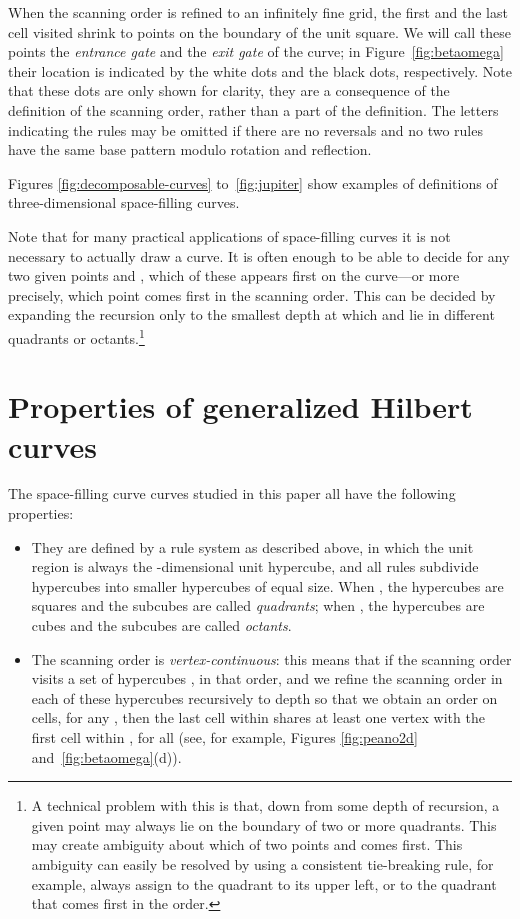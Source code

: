 \documentclass[11pt,a4paper]{article}
\begin{document}
When the scanning order is refined to an infinitely fine grid, the first and the last cell visited shrink to points on the boundary of the unit square. We will call these points the \emph{entrance gate} and the \emph{exit gate} of the curve; in Figure~\ref{fig:betaomega} their location is indicated by the white dots and the black dots, respectively. Note that these dots are only shown for clarity, they are a consequence of the definition of the scanning order, rather than a part of the definition.
The letters indicating the rules may be omitted if there are no reversals and no two rules have the same base pattern modulo rotation and reflection.

Figures \ref{fig:decomposable-curves} to~\ref{fig:jupiter} show examples of definitions of three-dimensional space-filling curves.

Note that for many practical applications of space-filling curves it is not necessary to actually draw a curve. It is often enough to be able to decide for any two given points  and , which of these appears first on the curve---or more precisely, which point comes first in the scanning order. This can be decided by expanding the recursion only to the smallest depth at which  and  lie in different quadrants or octants.\footnote{A technical problem with this is that, down from some depth of recursion, a given point  may always lie on the boundary of two or more quadrants. This may create ambiguity about which of two points  and  comes first. This ambiguity can easily be resolved by using a consistent tie-breaking rule, for example, always assign  to the quadrant to its upper left, or to the quadrant that comes first in the order.}

\section{Properties of generalized Hilbert curves}
\label{sec:properties}

The space-filling curve curves studied in this paper all have the following properties:\begin{itemize}
\item They are defined by a rule system as described above, in which the unit region is always the -dimensional unit hypercube, and all rules subdivide hypercubes into  smaller hypercubes of equal size. When , the hypercubes are squares and the subcubes are called \emph{quadrants}; when , the hypercubes are cubes and the subcubes are called \emph{octants}.
\item The scanning order is \emph{vertex-continuous}: this means that if the scanning order visits a set of hypercubes , in that order, and we refine the scanning order in each of these hypercubes recursively to depth  so that we obtain an order on  cells, for any , then the last cell within  shares at least one vertex with the first cell within , for all  (see, for example,  Figures \ref{fig:peano2d} and~\ref{fig:betaomega}(d)).
\end{itemize}
\end{document}
